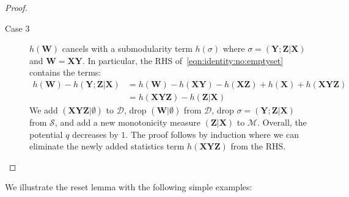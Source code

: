 \documentclass{theoretics}
\newcommand{\calM}{\mathcal M}
\newcommand{\calS}{\mathcal S}
\newcommand{\calD}{\mathcal D}
\begin{document}
\begin{proof}
\begin{description}
    \item[Case 3] $h(\bm W)$ cancels with a submodularity term $h(\sigma)$ where
    $\sigma = (\bm Y;\bm Z|\bm X)$ and $\bm W = \bm X \bm Y$.
    In particular, the RHS of~\eqref{eqn:identity:no:emptyset} contains the terms:
    \begin{align}
      h(\bm W) -h(\bm Y;\bm Z|\bm X)&=
      h(\bm W) -h(\bm X\bm Y) - h(\bm X\bm Z) + h(\bm X) + h(\bm X \bm Y \bm Z) \nonumber \\
      &= h(\bm X \bm Y \bm Z)  - h(\bm Z|\bm X)
      \label{eqn:S:step}
    \end{align}
    We add $(\bm X\bm Y\bm Z|\emptyset)$ to $\calD$, drop $(\bm W|\emptyset)$ from $\calD$,
    drop $\sigma = (\bm Y;\bm Z|\bm X)$ from $\calS$, and add a new monotonicity measure
    $(\bm Z|\bm X)$ to $\calM$. Overall, the potential $q$ decreases by $1$.
    The proof follows by induction where we can eliminate the newly added statistics term $h(\bm X\bm Y\bm Z)$ from the RHS.
  \end{description}
\end{proof}

We illustrate the reset lemma with the following simple examples:
\end{document}
